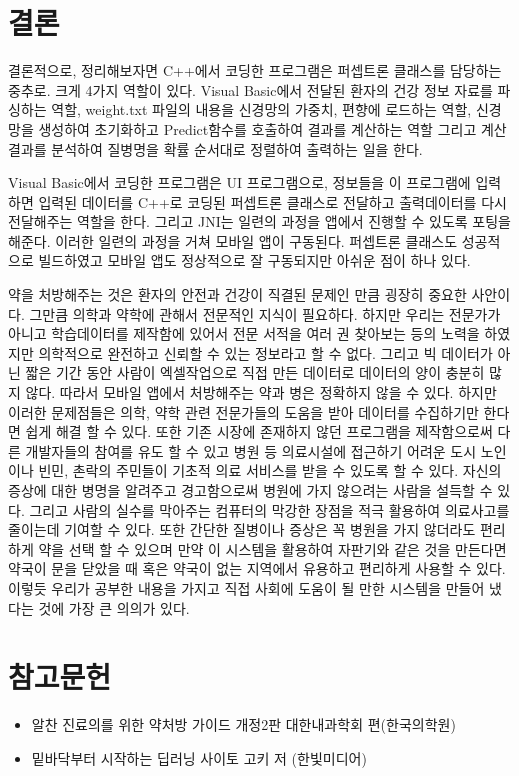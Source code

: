 \documentclass{report}
\begin{document}
\section{결론}
결론적으로, 정리해보자면 C++에서 코딩한 프로그램은 퍼셉트론 클래스를 담당하는 중추로. 크게 4가지 역할이 있다. Visual Basic에서 전달된 환자의 건강 정보 자료를 파싱하는 역할, weight.txt 파일의 내용을 신경망의 가중치, 편향에 로드하는 역할, 신경망을 생성하여 초기화하고 Predict함수를 호출하여 결과를 계산하는 역할 그리고 계산 결과를 분석하여 질병명을 확률 순서대로 정렬하여 출력하는 일을 한다. 

 Visual Basic에서 코딩한 프로그램은 UI 프로그램으로, 정보들을 이 프로그램에 입력하면 입력된 데이터를 C++로 코딩된 퍼셉트론 클래스로 전달하고 출력데이터를 다시 전달해주는 역할을 한다. 그리고 JNI는 일련의 과정을 앱에서 진행할 수 있도록 포팅을 해준다. 이러한 일련의 과정을 거쳐 모바일 앱이 구동된다. 퍼셉트론 클래스도 성공적으로 빌드하였고 모바일 앱도 정상적으로 잘 구동되지만 아쉬운 점이 하나 있다.

약을 처방해주는 것은 환자의 안전과 건강이 직결된 문제인 만큼 굉장히 중요한 사안이다. 그만큼 의학과 약학에 관해서 전문적인 지식이 필요하다. 하지만 우리는 전문가가 아니고 학습데이터를 제작함에 있어서 전문 서적을 여러 권 찾아보는 등의 노력을 하였지만 의학적으로 완전하고 신뢰할 수 있는 정보라고 할 수 없다. 그리고 빅 데이터가 아닌 짧은 기간 동안 사람이 엑셀작업으로 직접 만든 데이터로 데이터의 양이 충분히 많지 않다. 따라서 모바일 앱에서 처방해주는 약과 병은 정확하지 않을 수 있다. 하지만 이러한 문제점들은 의학, 약학 관련 전문가들의 도움을 받아 데이터를 수집하기만 한다면 쉽게 해결 할 수 있다. 또한 기존 시장에 존재하지 않던 프로그램을 제작함으로써 다른 개발자들의 참여를 유도 할 수 있고 병원 등 의료시설에 접근하기 어려운 도시 노인이나 빈민, 촌락의 주민들이 기초적 의료 서비스를 받을 수 있도록 할 수 있다. 자신의 증상에 대한 병명을 알려주고 경고함으로써 병원에 가지 않으려는 사람을 설득할 수 있다. 그리고 사람의 실수를 막아주는 컴퓨터의 막강한 장점을 적극 활용하여 의료사고를 줄이는데 기여할 수 있다. 또한 간단한 질병이나 증상은 꼭 병원을 가지 않더라도 편리하게 약을 선택 할 수 있으며  만약 이 시스템을 활용하여 자판기와 같은 것을 만든다면 약국이 문을 닫았을 때 혹은 약국이 없는 지역에서 유용하고 편리하게 사용할 수 있다. 이렇듯 우리가 공부한 내용을 가지고 직접 사회에 도움이 될 만한 시스템을 만들어 냈다는 것에 가장 큰 의의가 있다.

\section{참고문헌}
\begin{itemize}
  \item 알찬 진료의를 위한 약처방 가이드 개정2판 대한내과학회 편(한국의학원)
  \item 밑바닥부터 시작하는 딥러닝 사이토 고키 저 (한빛미디어)
\end{itemize}





\listoffigures
\listoflistings
\end{document}
